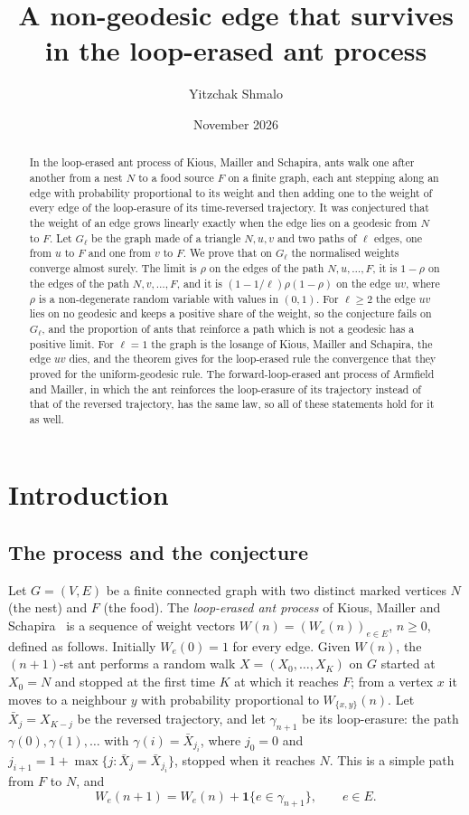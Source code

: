 \documentclass[11pt]{amsart}
\title{A non-geodesic edge that survives in the loop-erased ant process}
\author{Yitzchak Shmalo}
\date{November 2026}
\theoremstyle{remark}
\newcommand{\one}{\mathbf{1}}
\begin{document}
\begin{abstract}
In the loop-erased ant process of Kious, Mailler and Schapira, ants walk one after another from a nest $N$ to a food
source $F$ on a finite graph, each ant stepping along an edge with probability proportional to its weight and then
adding one to the weight of every edge of the loop-erasure of its time-reversed trajectory. It was conjectured that the
weight of an edge grows linearly exactly when the edge lies on a geodesic from $N$ to $F$. Let $G_\ell$ be the graph
made of a triangle $N,u,v$ and two paths of $\ell$ edges, one from $u$ to $F$ and one from $v$ to $F$. We prove that on
$G_\ell$ the normalised weights converge almost surely. The limit is $\rho$ on the edges of the path
$N,u,\dots,F$, it is $1-\rho$ on the edges of the path $N,v,\dots,F$, and it is $(1-1/\ell)\rho(1-\rho)$ on the edge
$uv$, where $\rho$ is a non-degenerate random variable with values in $(0,1)$. For $\ell\ge2$ the edge $uv$ lies on no
geodesic and keeps a positive share of the weight, so the conjecture fails on $G_\ell$, and the proportion of ants that
reinforce a path which is not a geodesic has a positive limit. For $\ell=1$ the graph is the losange of Kious, Mailler
and Schapira, the edge $uv$ dies, and the theorem gives for the loop-erased rule the convergence that they proved for
the uniform-geodesic rule. The forward-loop-erased ant process of Armfield and Mailler, in which the ant reinforces the
loop-erasure of its trajectory instead of that of the reversed trajectory, has the same law, so all of these statements
hold for it as well.
\end{abstract}
\maketitle

\section{Introduction}

\subsection{The process and the conjecture}
Let $G=(V,E)$ be a finite connected graph with two distinct marked vertices $N$ (the nest) and $F$ (the food). The
\emph{loop-erased ant process} of Kious, Mailler and Schapira~\cite{KMS} is a sequence of weight vectors
$W(n)=(W_e(n))_{e\in E}$, $n\ge0$, defined as follows. Initially $W_e(0)=1$ for every edge. Given $W(n)$, the
$(n+1)$-st ant performs a random walk $X=(X_0,\dots,X_K)$ on $G$ started at $X_0=N$ and stopped at the first time $K$
at which it reaches $F$; from a vertex $x$ it moves to a neighbour $y$ with probability proportional to
$W_{\{x,y\}}(n)$. Let $\bar X_j=X_{K-j}$ be the reversed trajectory, and let $\gamma_{n+1}$ be its loop-erasure: the
path $\gamma(0),\gamma(1),\dots$ with $\gamma(i)=\bar X_{j_i}$, where $j_0=0$ and
$j_{i+1}=1+\max\{j:\bar X_j=\bar X_{j_i}\}$, stopped when it reaches $N$. This is a simple path from $F$ to $N$, and
\[
W_e(n+1)=W_e(n)+\one\{e\in\gamma_{n+1}\},\qquad e\in E .
\]
\end{document}
